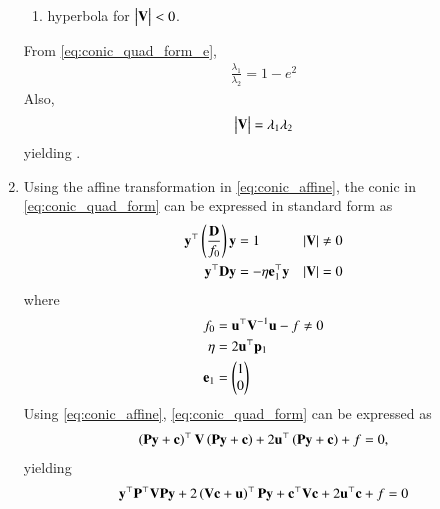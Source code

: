 \begin{enumerate}[label=\thesubsection.\arabic*.,ref=\thesubsection.\theenumi]
\begin{enumerate}
		\item hyperbola for $\begin{vmatrix}\mathbf{V}\end{vmatrix} < 0 $.
	\end{enumerate}
\solution
  From \eqref{eq:conic_quad_form_e},
\begin{align}
  \frac{\lambda_1}{\lambda_2} = 1 - e^2
\end{align}
Also, 
\begin{align}
	\begin{vmatrix}\mathbf{V}\end{vmatrix} =   \lambda_1\lambda_2 
\end{align}
	yielding .
\begin{table}[!h]
\centering
\resizebox{\columnwidth}{!}{%

	}
	\caption{}
\label{table:det}
\end{table}
\item
Using the affine transformation in
	\eqref{eq:conic_affine},
	the conic in     \eqref{eq:conic_quad_form} can be expressed in standard form 
	as
  \begin{align}
    \label{eq:conic_simp_temp_nonparab}
	    \mathbf{y}^{\top}\left(\frac{\mathbf{D}}{f_0}\right)\mathbf{y} &= 1   &  \left\vert\mathbf{V}\right\vert &\ne 0
    \\
	    \mathbf{y}^{\top}\mathbf{D}\mathbf{y} &=  -\eta\mathbf{e}_1^{\top}\mathbf{y}   & \left\vert\mathbf{V}\right\vert &= 0
    \label{eq:conic_simp_temp_parab}
    \end{align}
    where
  \begin{align}
      \label{eq:f0}
	  f_0 &=\mathbf{u}^{\top}\mathbf{V}^{-1}\mathbf{u} -f \ne 0
	  \\
      \label{eq:eta}
       \eta &=2\mathbf{u}^{\top}\mathbf{p}_1
       \\
       \mathbf{e}_1 &=\begin{pmatrix}1 \\ 0\end{pmatrix}
      \end{align}
   \solution 
  \label{app:parab}
	Using 
\eqref{eq:conic_affine},
\eqref{eq:conic_quad_form} can be expressed as
\begin{align}
\left(\mathbf{P}\mathbf{y}+\mathbf{c}\right)^{\top}\mathbf{V}\left(\mathbf{P}\mathbf{y}+\mathbf{c}\right)+2\mathbf{u}^{\top}\left(\mathbf{P}\mathbf{y}+\mathbf{c}\right)+ f
	= 0, 
\end{align}
yielding 
\begin{align}
\mathbf{y}^{\top}\mathbf{P}^{\top}\mathbf{V}\mathbf{P}\mathbf{y}+2\left(\mathbf{V}\mathbf{c}+\mathbf{u}\right)^{\top}\mathbf{P}\mathbf{y}
+  \mathbf{c}^{\top}\mathbf{V}\mathbf{c} + 2\mathbf{u}^{\top}\mathbf{c} + f= 0
\label{eq:conic_simp_one}
\end{align}

\end{enumerate}
